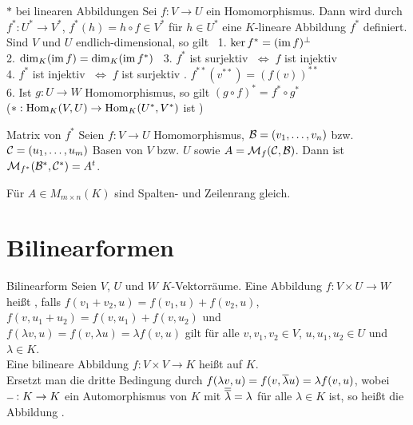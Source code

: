 \begin{Satz}{$\ast$ bei linearen Abbildungen}
    Sei $f: V \rightarrow U$ ein Homomorphismus.
    Dann wird durch $f^\ast: U^\ast \rightarrow V^\ast$,
    $f^\ast(h) = h \circ f \in V^\ast$ für $h \in U^\ast$ eine
    $K$-lineare Abbildung $f^\ast$ definiert. \\
    Sind $V$ und $U$ endlich-dimensional, so gilt \qquad\;\;\,
    1. $\ker f^\ast = (\operatorname{im} f)^\bot$ \\
    2. $\dim_K(\operatorname{im} f) = \dim_K(\operatorname{im} f^\ast)$ \qquad\qquad\qquad\qquad\,
    3. $f^\ast$ ist surjektiv $\;\Leftrightarrow\; f$ ist injektiv \\
    4. $f^\ast$ ist injektiv $\;\Leftrightarrow\; f$ ist surjektiv
    \qquad\qquad{}. $f^{\ast\ast}(v^{\ast\ast}) = (f(v))^{\ast\ast}$ \\
    6. Ist $g: U \rightarrow W$ Homomorphismus, so gilt
    $(g \circ f)^\ast = f^\ast \circ g^\ast$ \\
    ($\ast: \operatorname{Hom}_K(V, U) \rightarrow \operatorname{Hom}_K(U^\ast, V^\ast)$ ist
    )
\end{Satz}

\begin{Satz}{Matrix von $f^\ast$}
    Seien $f: V \rightarrow U$ Homomorphismus,
    $\mathcal{B} = (v_1, \ldots, v_n)$ bzw.\\
    $\mathcal{C} = (u_1, \ldots, u_m)$
    Basen von $V$ bzw. $U$ sowie $A = \mathcal{M}_{f}(\mathcal{C},\mathcal{B})$.
    Dann ist $\mathcal{M}_{f^\ast}(\mathcal{B^\ast},\mathcal{C^\ast}) = A^t$.
\end{Satz}

\begin{Kor}
    Für $A \in M_{m \times n}(K)$ sind Spalten- und Zeilenrang gleich.
\end{Kor}

\section{%
    Bilinearformen%
}

\begin{Def}{Bilinearform}
    Seien $V$, $U$ und $W$ $K$-Vektorräume.
    Eine Abbildung $f: V \times U \rightarrow W$ heißt ,
    falls $f(v_1 + v_2, u) = f(v_1, u) + f(v_2, u)$,
    $f(v, u_1 + u_2) = f(v, u_1) + f(v, u_2)$ und \\
    $f(\lambda v, u) = f(v, \lambda u) = \lambda f(v, u)$ gilt
    für alle $v, v_1, v_2 \in V$, $u, u_1, u_2 \in U$ und $\lambda \in K$. \\
    Eine bilineare Abbildung $f: V \times V \rightarrow K$ heißt
     auf $K$. \\
    Ersetzt man die dritte Bedingung durch
    $f(\lambda v, u) = f(v, \overline{\lambda} u) = \lambda f(v, u)$, wobei
    $\overline{\;\;}: K \rightarrow K$ ein Automorphismus von $K$ mit
    $\overline{\overline{\lambda}} = \lambda$ für alle $\lambda \in K$ ist,
    so heißt die Abbildung .
\end{Def}

